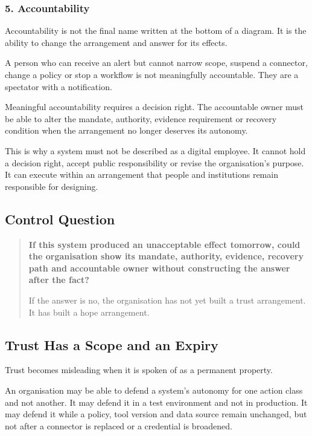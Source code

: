 \subsubsection{5. Accountability}\label{accountability}

Accountability is not the final name written at the bottom of a diagram.
It is the ability to change the arrangement and answer for its effects.

A person who can receive an alert but cannot narrow scope, suspend a
connector, change a policy or stop a workflow is not meaningfully
accountable. They are a spectator with a notification.

Meaningful accountability requires a decision right. The accountable
owner must be able to alter the mandate, authority, evidence requirement
or recovery condition when the arrangement no longer deserves its
autonomy.

This is why a system must not be described as a digital employee. It
cannot hold a decision right, accept public responsibility or revise the
organisation's purpose. It can execute within an arrangement that people
and institutions remain responsible for designing.

\subsection{Control Question}\label{control-question}

\begin{quote}
\textbf{If this system produced an unacceptable effect tomorrow, could
the organisation show its mandate, authority, evidence, recovery path
and accountable owner without constructing the answer after the fact?}

If the answer is no, the organisation has not yet built a trust
arrangement. It has built a hope arrangement.
\end{quote}

\subsection{Trust Has a Scope and an
Expiry}\label{trust-has-a-scope-and-an-expiry}

Trust becomes misleading when it is spoken of as a permanent property.

An organisation may be able to defend a system's autonomy for one action
class and not another. It may defend it in a test environment and not in
production. It may defend it while a policy, tool version and data
source remain unchanged, but not after a connector is replaced or a
credential is broadened.

